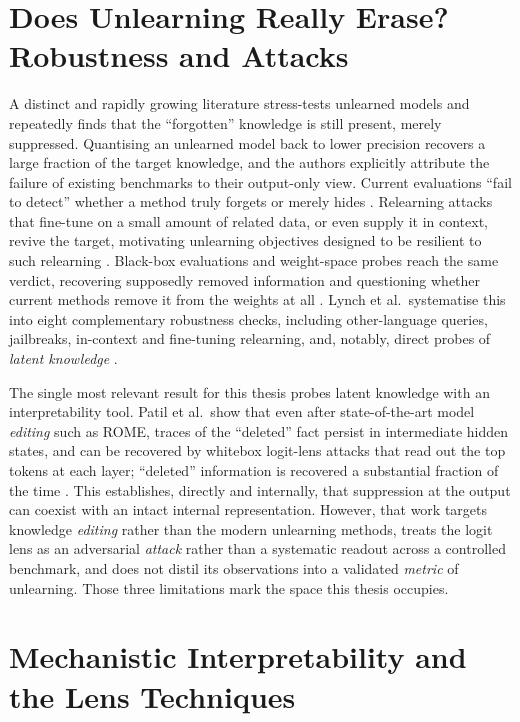 \section{Does Unlearning Really Erase? Robustness and Attacks}
\label{sec:rw-robustness}

A distinct and rapidly growing literature stress-tests unlearned models and repeatedly finds that the
``forgotten'' knowledge is still present, merely suppressed. Quantising an unlearned model back to lower
precision recovers a large fraction of the target knowledge, and the authors explicitly attribute the
failure of existing benchmarks to their output-only view. Current evaluations ``fail to detect'' whether a
method truly forgets or merely hides \citep{zhang2024quantization}. Relearning attacks that fine-tune on a
small amount of related data, or even supply it in context, revive the target, motivating unlearning
objectives designed to be resilient to such relearning \citep{lynch2024eight,fan2025relearn}. Black-box
evaluations and weight-space probes reach the same verdict, recovering supposedly removed information and
questioning whether current methods remove it from the weights at all \citep{thaker2024blackbox,
deeb2024weights}. Lynch et al.\ systematise this into eight complementary robustness checks, including
other-language queries, jailbreaks, in-context and fine-tuning relearning, and, notably, direct probes of
\emph{latent knowledge} \citep{lynch2024eight}.

The single most relevant result for this thesis probes latent knowledge with an interpretability tool.
Patil et al.\ show that even after state-of-the-art model \emph{editing} such as ROME, traces of the
``deleted'' fact persist in intermediate hidden states, and can be recovered by whitebox logit-lens attacks
that read out the top tokens at each layer; ``deleted'' information is recovered a substantial fraction of
the time \citep{patil2023candelete}. This establishes, directly and internally, that suppression at the
output can coexist with an intact internal representation. However, that work targets knowledge \emph{editing}
rather than the modern unlearning methods, treats the logit lens as an adversarial \emph{attack} rather than
a systematic readout across a controlled benchmark, and does not distil its observations into a validated
\emph{metric} of unlearning. Those three limitations mark the space this thesis occupies.

\section{Mechanistic Interpretability and the Lens Techniques}
\label{sec:rw-mechinterp}

